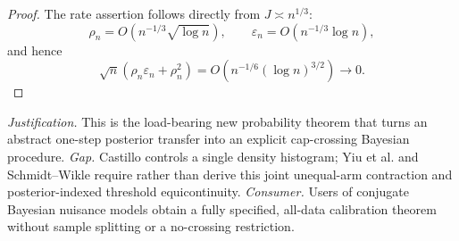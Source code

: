 \documentclass{article}
\begin{document}
\begin{proof}
The rate assertion follows directly from \(J\asymp n^{1/3}\):
\begin{equation}
 \rho_n=O(n^{-1/3}\sqrt{\log n}),\qquad
 \varepsilon_n=O(n^{-1/3}\log n),
\end{equation}
and hence
\begin{equation}
 \sqrt n(\rho_n\varepsilon_n+\rho_n^2)
 =O(n^{-1/6}(\log n)^{3/2})\longrightarrow0.                                             \tag{38}
\end{equation}
\end{proof}
\par\smallskip\noindent \textit{Justification.} This is the load-bearing new probability theorem that turns an abstract one-step posterior transfer into an explicit cap-crossing Bayesian procedure. \textit{Gap.} Castillo controls a single density histogram; Yiu et al. and Schmidt--Wikle require rather than derive this joint unequal-arm contraction and posterior-indexed threshold equicontinuity. \textit{Consumer.} Users of conjugate Bayesian nuisance models obtain a fully specified, all-data calibration theorem without sample splitting or a no-crossing restriction.
\end{document}
